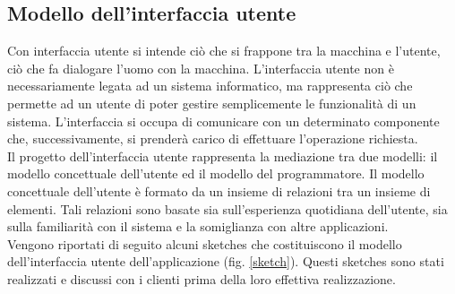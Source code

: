 \subsection{Modello dell'interfaccia utente}
Con interfaccia utente si intende ciò che si frappone tra la macchina e l'utente, ciò che fa dialogare l'uomo con la macchina.
L'interfaccia utente non è necessariamente legata ad un sistema informatico, ma rappresenta ciò che permette ad un utente di poter gestire  semplicemente le funzionalità di un sistema.
L'interfaccia si occupa di comunicare con un determinato componente che, successivamente, si prenderà carico di effettuare l'operazione richiesta.\\
Il progetto dell'interfaccia utente rappresenta la mediazione tra due modelli: il modello concettuale dell'utente ed il modello del programmatore.
Il modello concettuale dell'utente è formato da un insieme di relazioni tra un insieme di elementi. Tali relazioni sono basate sia sull'esperienza quotidiana dell'utente, sia sulla familiarità con il sistema e la somiglianza con altre applicazioni.\\
Vengono riportati di seguito alcuni sketches che costituiscono il modello dell'interfaccia utente dell'applicazione (fig. \ref{sketch}).
Questi sketches sono stati realizzati e discussi con i clienti prima della loro effettiva realizzazione.
